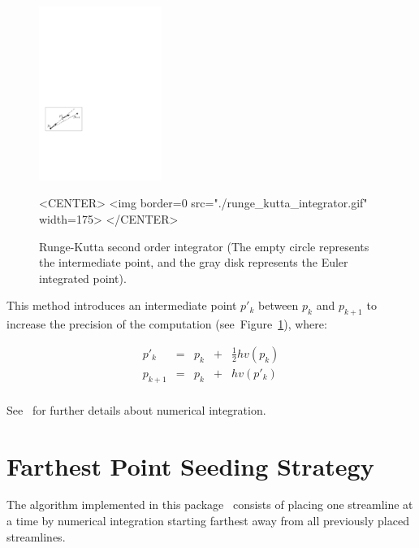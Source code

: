 \begin{figure}[h!]
\begin{ccTexOnly}
\begin{center}
\includegraphics[width=4cm]{Stream_lines_2/runge_kutta_integrator}
\end{center}
\end{ccTexOnly}
\begin{ccHtmlOnly}
<CENTER>
<img border=0 src="./runge_kutta_integrator.gif" width=175>
</CENTER>
\end{ccHtmlOnly}
\begin{center}
\caption{Runge-Kutta second order integrator (The empty circle represents the intermediate point, and the gray disk represents the Euler integrated point).
\label{runge_kutta_fig}}
\end{center}
\end{figure}

This method introduces an intermediate point $p'_k$ between $p_k$ and $p_{k+1}$ to increase the
precision of the computation (see~Figure~\ref{runge_kutta_fig}), where:

$$
\begin{array}{ccccc}
    p'_k    & = & p_k & + & \frac{1}{2}hv(p_k) \\
    p_{k+1} & = & p_k & + & hv(p'_k)        \\
   \end{array}
$$

See~\cite{cgal:ptvf-nrcpp-02} for further details about numerical
integration.

\section{Farthest Point Seeding Strategy\label{Section_2D_Streamlines_Strategy}}

The algorithm implemented in this package~\cite{cgal:mad-fpsep-05}
consists of placing one streamline at a time by numerical integration
starting farthest away from all previously placed
streamlines.\\

